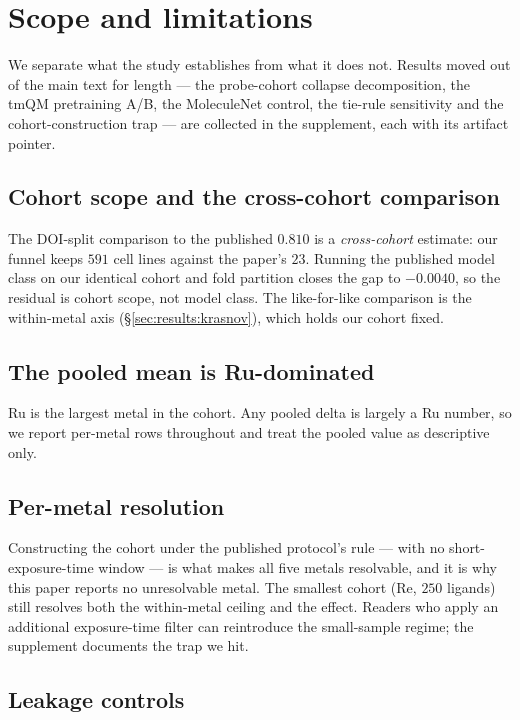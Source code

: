 \section{Scope and limitations}
\label{sec:limitations}

We separate what the study establishes from what it does not. Results moved out
of the main text for length --- the probe-cohort collapse decomposition, the
tmQM pretraining A/B, the MoleculeNet control, the tie-rule sensitivity and the
cohort-construction trap --- are collected in the supplement, each with its
artifact pointer.

\subsection{Cohort scope and the cross-cohort comparison}
\label{sec:lim:caveat}

The DOI-split comparison to the published $0.810$ is a \emph{cross-cohort}
estimate: our funnel keeps $591$ cell lines against the paper's $23$. Running
the published model class on our identical cohort and fold partition closes the
gap to $-0.0040$, so the residual is cohort scope, not model class. The
like-for-like comparison is the within-metal axis
(\S\ref{sec:results:krasnov}), which holds our cohort fixed.

\subsection{The pooled mean is Ru-dominated}
\label{sec:lim:pooled}

Ru is the largest metal in the cohort. Any pooled \fsma{} delta is largely a Ru
number, so we report per-metal rows throughout and treat the pooled value as
descriptive only.

\subsection{Per-metal resolution}
\label{sec:lim:small}

Constructing the cohort under the published protocol's rule --- with no
short-exposure-time window --- is what makes all five metals resolvable, and it
is why this paper reports no unresolvable metal. The smallest cohort (Re, $250$
ligands) still resolves both the within-metal ceiling and the \fsma{} effect.
Readers who apply an additional exposure-time filter can reintroduce the
small-sample regime; the supplement documents the trap
we hit.

\subsection{Leakage controls}
\label{sec:lim:leak}

